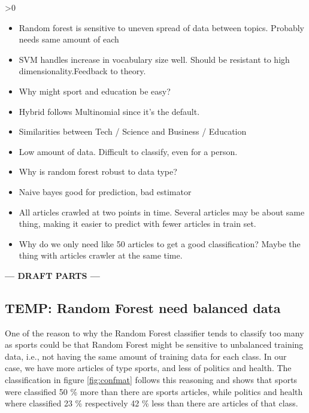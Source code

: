 \ifnum\printdraft>0
	\begin{itemize}
		\item Random forest is sensitive to uneven spread of data between topics. Probably needs same amount of each
		\item SVM handles increase in vocabulary size well. Should be resistant to high dimensionality.Feedback to theory.
		\item Why might sport and education be easy?
		\item Hybrid follows Multinomial since it's the default.
		\item Similarities between Tech / Science and Business / Education
		\item Low amount of data. Difficult to classify, even for a person.
		\item Why is random forest robust to data type?
		\item Naive bayes good for prediction, bad estimator
		\item All articles crawled at two points in time. Several articles may be about same thing, making it easier to predict with fewer articles in train set.
		\item Why do we only need like 50 articles to get a good classification? Maybe the thing with articles crawler at the same time.
	\end{itemize}
\else
\begin{center}
	\textbf{--- DRAFT PARTS ---}
\end{center}
\fi

\subsection{TEMP: Random Forest need balanced data} %
\label{sub:temp_random_forest_need_balanced_data}
One of the reason to why the Random Forest classifier tends to classify too many as sports could be that Random Forest might be sensitive to unbalanced training data, i.e., not having the same amount of training data for each class. In our case, we have more articles of type sports, and less of politics and health. The classification in figure \ref{fig:confmat} follows this reasoning and shows that sports were classified 50 \% more than there are sports articles, while politics and health where classified 23 \% respectively 42 \% less than there are articles of that class.

